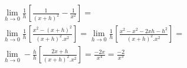\begin{ex}
\begin{align}
&\lim_{h\rightarrow 0} \frac{1}{h}\left[\frac{1}{(x+h)^2}-\frac{1}{x^2}\right]=\nonumber\\
&\lim_{h\rightarrow 0} \frac{1}{h}\left[\frac{x^2-(x+h)^2}{(x+h)^2.x^2}\right]=\lim_{h\rightarrow 0} \frac{1}{h}\left[\frac{x^2-x^2-2xh-h^2}{(x+h)^2.x^2}\right]=\nonumber\\
&\lim_{h\rightarrow 0} -\frac{h}{h}\left[\frac{2x+h}{(x+h)^2.x^2}\right]=\frac{-2x}{x^4}=\frac{-2}{x^3}\nonumber
\end{align}
\end{ex}